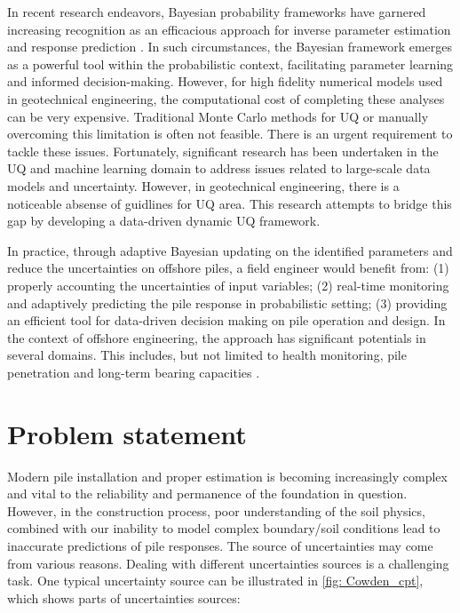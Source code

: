 In recent research endeavors, Bayesian probability frameworks have garnered increasing recognition as an efficacious approach for inverse parameter estimation and response prediction \citep{finno2005,nakamura2011,hsein2013,nguyen2016,wagner2020,jin2021,tao2021,buckley2023,tang2023}. In such circumstances, the Bayesian framework emerges as a powerful tool within the probabilistic context, facilitating parameter learning and informed decision-making. However, for high fidelity numerical models used in geotechnical engineering, the computational cost of completing these analyses can be very expensive. Traditional Monte Carlo methods for UQ or manually overcoming this limitation is often not feasible. There is an urgent requirement to tackle these issues. Fortunately, significant research has been undertaken in the UQ and machine learning domain to address issues related to large-scale data models and uncertainty. However, in geotechnical engineering, there is a noticeable absense of guidlines for UQ area. This research attempts to bridge this gap by developing a data-driven dynamic UQ framework. 

In practice, through adaptive Bayesian updating on the identified parameters and reduce the uncertainties on offshore piles, a field engineer would benefit from: (1) properly accounting the uncertainties of input variables; (2) real-time monitoring and adaptively predicting the pile response in probabilistic setting; (3) providing an efficient tool for data-driven decision making on pile operation and design. In the context of offshore engineering, the approach has significant potentials in several domains. This includes, but not limited to health monitoring, pile penetration and long-term bearing capacities \citep{wang2021,zhao2023,stuyts2023}. 



\section{Problem statement}

Modern pile installation and proper estimation is becoming increasingly complex and vital to the reliability and permanence of the foundation in question. However, in the construction process, poor understanding of the soil physics, combined with our inability to model complex boundary/soil conditions lead to inaccurate predictions of pile responses. The source of uncertainties may come from various reasons. Dealing with different uncertainties sources is a challenging task. One typical uncertainty source can be illustrated in \cref{fig: Cowden_cpt}, which shows parts of uncertainties sources:

